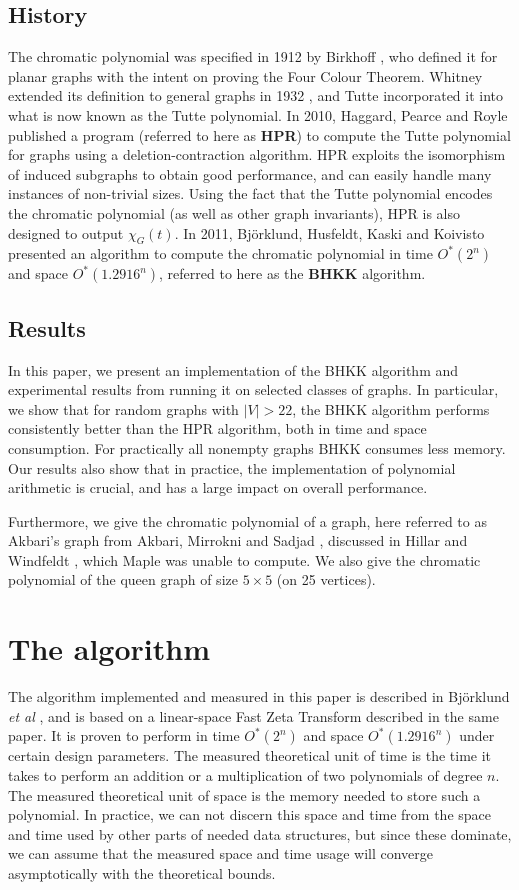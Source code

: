 \documentclass[a4paper]{article}
\begin{document}
\subsection{History}
The chromatic polynomial was specified in 1912 by Birkhoff \cite{birkhoff}, who defined it for planar graphs with the intent on proving the Four Colour Theorem. Whitney extended its definition to general graphs in 1932 \cite{whitney}, and Tutte incorporated it into what is now known as the Tutte polynomial.
In 2010, Haggard, Pearce and Royle \cite{haggard} published a program (referred to here as \textbf{HPR}) to compute the Tutte polynomial for graphs using a deletion-contraction algorithm. HPR exploits the isomorphism of induced subgraphs to obtain good performance, and can easily handle many instances of non-trivial sizes. Using the fact that the Tutte polynomial encodes the chromatic polynomial (as well as other graph invariants), HPR is also designed to output $\chi_G(t)$. 
In 2011, Björklund, Husfeldt, Kaski and Koivisto \cite{cov_pack} presented an algorithm to compute the chromatic polynomial in time $O^*(2^n)$ and space $O^*(1.2916^n)$, referred to here as the \textbf{BHKK} algorithm.

\subsection{Results}
In this paper, we present an implementation of the BHKK algorithm and experimental results from running it on selected classes of graphs. In particular, we show that for random graphs with $|V| > 22$, the BHKK algorithm performs consistently better than the HPR algorithm, both in time and space consumption. For practically all nonempty graphs BHKK consumes less memory. Our results also show that in practice, the implementation of polynomial arithmetic is crucial, and has a large impact on overall performance.

Furthermore, we give the chromatic polynomial of a graph, here referred to as Akbari's graph from Akbari, Mirrokni and Sadjad \cite{akbari}, discussed in Hillar and Windfeldt \cite{hillar_windfeldt}, which Maple was unable to compute.
We also give the chromatic polynomial of the queen graph of size $5 \times 5$ (on 25 vertices).

\section{The algorithm}
The algorithm implemented and measured in this paper is described in Björklund \emph{et al} \cite{cov_pack}, and is based on a linear-space Fast Zeta Transform described in the same paper. It is proven to perform in time $O^*(2^n)$ and space $O^*(1.2916^n)$ under certain design parameters. The measured theoretical unit of time is the time it takes to perform an addition or a multiplication of two polynomials of degree $n$. The measured theoretical unit of space is the memory needed to store such a polynomial. In practice, we can not discern this space and time from the space and time used by other parts of needed data structures, but since these dominate, we can assume that the measured space and time usage will converge asymptotically with the theoretical bounds.
\end{document}
